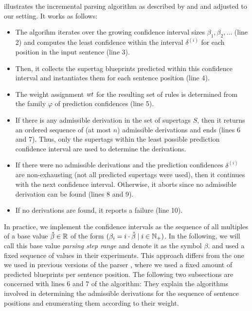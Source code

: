 \documentclass[../../document.tex]{subfiles}
\begin{document}
     illustrates the incremental parsing algorithm as described by \citet[Section~5.1]{Clark04} and \citet[Section~2.2.2]{Auli12} and adjusted to our setting.
    It works as follows:
    \begin{itemize}
        \item The algorihm iterates over the growing confidence interval sizes \(\beta_1, \beta_2, \ldots\) (line 2) and computes the least confidence within the interval \(\delta^{(i)}\) for each position in the input sentence (line 3).
        \item Then, it collects the supertag blueprints predicted within this confidence interval and instantiates them for each sentence position (line 4).
        \item The weight assignment \(\mathit{wt}\) for the resulting set of rules is determined from the family \(\varphi\) of prediction confidences (line 5).
        \item If there is any admissible derivation in the set of supertags \(S\), then it returns an ordered sequence of (at most \(n\)) admissible derivations and ends (lines 6 and 7). Thus, only the supertags within the least possible prediction confidence interval are used to determine the derivations.
        \item If there were no admissible derivations and the prediction confidences \(\delta^{(i)}\) are non-exhausting (not all predicted supertags were used), then it continues with the next confidence interval. Otherwise, it aborts since no admissible derivation can be found (lines 8 and 9).
        \item If no derivations are found, it reports a failure (line 10).
    \end{itemize}
    In practice, we implement the confidence intervals as the sequence of all multiples of a base value \(\hat{\beta}\in \mathbb{R}\) of the form \((\beta_i = i \cdot \hat{\beta} \mid i \in \mathbb{N}_+)\).
    In the following, we will call this base value \emph{parsing step range} and denote it as the symbol \(\beta\).
     and \citet{Auli12} used a fixed sequence of values in their experiments.
    This approach differs from the one we used in previous versions of the parser \citep{RupMoe21, Rup22}, where we used a fixed amount of predicted blueprints per sentence position.
    The following two subsections are concerned with lines 6 and 7 of the algorithm:
        They explain the algorithms involved in determining the admissible derivations for the sequence of sentence positions and enumerating them according to their weight.
\end{document}
